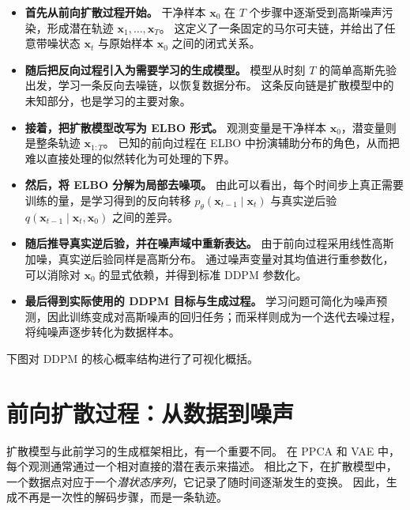 \begin{itemize}

    \item[\(\rightarrow\)] \textbf{首先从前向扩散过程开始。}
    干净样本 $\mathbf{x}_0$ 在 $T$ 个步骤中逐渐受到高斯噪声污染，形成潜在轨迹
    $\mathbf{x}_1,\dots,\mathbf{x}_T$。
    这定义了一条固定的马尔可夫链，并给出了任意带噪状态 $\mathbf{x}_t$ 与原始样本 $\mathbf{x}_0$ 之间的闭式关系。

    \item[\(\rightarrow\)] \textbf{随后把反向过程引入为需要学习的生成模型。}
    模型从时刻 $T$ 的简单高斯先验出发，学习一条反向去噪链，以恢复数据分布。
    这条反向链是扩散模型中的未知部分，也是学习的主要对象。

    \item[\(\rightarrow\)] \textbf{接着，把扩散模型改写为 ELBO 形式。}
    观测变量是干净样本 $\mathbf{x}_0$，潜变量则是整条轨迹 $\mathbf{x}_{1:T}$。
    已知的前向过程在 ELBO 中扮演辅助分布的角色，从而把难以直接处理的似然转化为可处理的下界。

    \item[\(\rightarrow\)] \textbf{然后，将 ELBO 分解为局部去噪项。}
    由此可以看出，每个时间步上真正需要训练的量，是学习得到的反向转移
    $p_\theta(\mathbf{x}_{t-1}\mid \mathbf{x}_t)$ 与真实逆后验
    $q(\mathbf{x}_{t-1}\mid \mathbf{x}_t,\mathbf{x}_0)$ 之间的差异。

    \item[\(\rightarrow\)] \textbf{随后推导真实逆后验，并在噪声域中重新表达。}
    由于前向过程采用线性高斯加噪，真实逆后验同样是高斯分布。
    通过噪声变量对其均值进行重参数化，可以消除对 $\mathbf{x}_0$ 的显式依赖，并得到标准 DDPM 参数化。

    \item[\(\rightarrow\)] \textbf{最后得到实际使用的 DDPM 目标与生成过程。}
    学习问题可简化为噪声预测，因此训练变成对高斯噪声的回归任务；而采样则成为一个迭代去噪过程，将纯噪声逐步转化为数据样本。

\end{itemize}

\medskip
\noindent 下图对 DDPM 的核心概率结构进行了可视化概括。

\medskip

\section{前向扩散过程：从数据到噪声}

扩散模型与此前学习的生成框架相比，有一个重要不同。
在 PPCA 和 VAE 中，每个观测通常通过一个相对直接的潜在表示来描述。
相比之下，在扩散模型中，一个数据点对应于一个\emph{潜状态序列}，它记录了随时间逐渐发生的变换。
因此，生成不再是一次性的解码步骤，而是一条轨迹。

